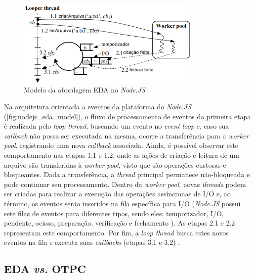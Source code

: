\documentclass[12pt]{article}
\begin{document}
\begin{figure}[H]
\centering
\includegraphics[width=0.8\textwidth]{images/pt-br/eda-arch-nodejs.png}
\caption{Modelo da abordagem EDA no \textit{Node.JS}}\label{fig:nodejs_eda_model}
\end{figure}

Na arquitetura orientada a eventos da plataforma do \textit{Node.JS} (\autoref{fig:nodejs_eda_model}), 
o fluxo de processamento de eventos da primeira etapa é realizada pelo \textit{loop thread}, 
buscando um evento no \textit{event loop} e, caso sua \textit{callback} não possa ser executada na mesma, ocorre
a transferência para a \textit{worker pool}, registrando uma nova \textit{callback} associada. 
Ainda, é possível observar este comportamento nas etapas 1.1 e 1.2, onde as ações de criação e leitura de 
um arquivo são transferidas à \textit{worker pool}, visto que são operações custosas e bloqueantes. Dada 
a transferência, a \textit{thread} principal permanece não-bloqueada e pode continuar seu processamento. 
Dentro da \textit{worker pool}, novas \textit{threads} podem ser criadas para realizar a execução das operações
assíncronas de I/O e, ao término, os eventos serão inseridos na fila específica para I/O (\textit{Node.JS} 
possui sete filas de eventos para diferentes tipos, sendo eles: temporizador, I/O, pendente, ocioso, preparação, 
verificação e fechamento \cite{NODEEVENTLOOP}). As etapas 2.1 e 2.2 representam este comportamento.
Por fim, a \textit{loop thread} busca estes novos eventos na fila e executa suas 
\textit{callbacks} (etapas 3.1 e 3.2) \cite{BUGS}.


\subsection{EDA \textit{vs.} OTPC}
\end{document}

